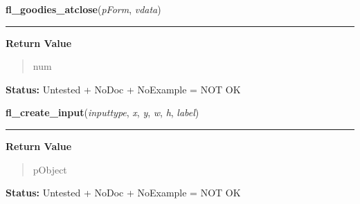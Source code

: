     \label{xformslib:library:fl_goodies_atclose}

    \vspace{0.5ex}

\hspace{.8\funcindent}\begin{boxedminipage}{\funcwidth}

    \raggedright \textbf{fl\_goodies\_atclose}(\textit{pForm}, \textit{vdata})

    \vspace{-1.5ex}

    \rule{\textwidth}{0.5\fboxrule}
\setlength{\parskip}{2ex}
\setlength{\parskip}{1ex}
      \textbf{Return Value}
    \vspace{-1ex}

      \begin{quote}
      num

      \end{quote}

\textbf{Status:} Untested + NoDoc + NoExample = NOT OK



    \end{boxedminipage}

    \label{xformslib:library:fl_create_input}

    \vspace{0.5ex}

\hspace{.8\funcindent}\begin{boxedminipage}{\funcwidth}

    \raggedright \textbf{fl\_create\_input}(\textit{inputtype}, \textit{x}, \textit{y}, \textit{w}, \textit{h}, \textit{label})

    \vspace{-1.5ex}

    \rule{\textwidth}{0.5\fboxrule}
\setlength{\parskip}{2ex}
\setlength{\parskip}{1ex}
      \textbf{Return Value}
    \vspace{-1ex}

      \begin{quote}
      pObject

      \end{quote}

\textbf{Status:} Untested + NoDoc + NoExample = NOT OK



    \end{boxedminipage}

